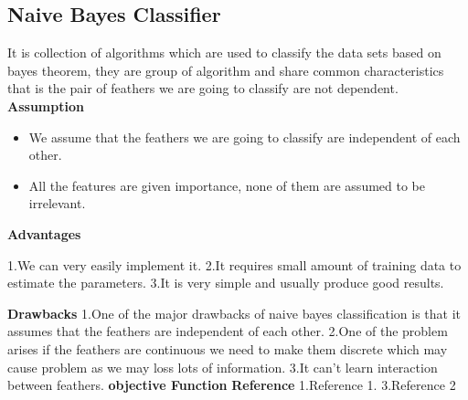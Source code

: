 \documentclass{article}
\begin{document}
\subsection{Naive Bayes Classifier}
It is collection of algorithms which are used to classify the data sets based on bayes theorem, they are group of algorithm and share common characteristics that is the pair of feathers we are going to classify are not dependent. \newline
\textbf{Assumption}\newline
\begin{itemize}
\item We assume that the feathers we are going to classify are independent of each other.
\item All the features are given importance, none of them are assumed to be irrelevant.
\end{itemize}
\textbf{Advantages}\newline
\begin{itemize}
1.We can very easily implement it.\newline
2.It requires small amount of training data to estimate the parameters.\newline
3.It is very simple and usually produce good results.
\end{itemize}
\textbf{Drawbacks}\newline
1.One of the major drawbacks of naive bayes classification is that it assumes that the feathers are independent of each other.\newline
2.One of the problem arises if the feathers are continuous we need to make them discrete which may cause problem as we may loss lots of information.\newline
3.It can't learn interaction between feathers. \newline
\textbf{objective Function}\newline
\textbf{Reference}\newline
1.Reference 1.\newline
3.Reference 2 \newline
\end{document}
